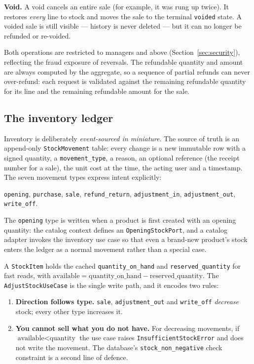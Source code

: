 \documentclass[11pt,a4paper]{article}
\begin{document}
\textbf{Void.} A void cancels an entire sale (for example, it was rung up twice). It restores
\emph{every} line to stock and moves the sale to the terminal \texttt{voided} state. A voided sale is
still visible --- history is never deleted --- but it can no longer be refunded or re-voided.

Both operations are restricted to managers and above (Section~\ref{sec:security}), reflecting the
fraud exposure of reversals. The refundable quantity and amount are always computed by the
aggregate, so a sequence of partial refunds can never over-refund: each request is validated against
the remaining refundable quantity for its line and the remaining refundable amount for the sale.

\subsection{The inventory ledger}
\label{sec:ledger}

Inventory is deliberately \emph{event-sourced in miniature}. The source of truth is an append-only
\texttt{StockMovement} table: every change is a new immutable row with a signed quantity, a
\texttt{movement\_type}, a reason, an optional reference (the receipt number for a sale), the unit
cost at the time, the acting user and a timestamp. The seven movement types express intent
explicitly:

\begin{center}\small
\texttt{opening}, \texttt{purchase}, \texttt{sale}, \texttt{refund\_return},
\texttt{adjustment\_in}, \texttt{adjustment\_out}, \texttt{write\_off}.
\end{center}

The \texttt{opening} type is written when a product is first created with an opening quantity: the
catalog context defines an \texttt{OpeningStockPort}, and a catalog adapter invokes the inventory use
case so that even a brand-new product's stock enters the ledger as a normal movement rather than a
special case.

A \texttt{StockItem} holds the cached \texttt{quantity\_on\_hand} and \texttt{reserved\_quantity}
for fast reads, with $\text{available} = \text{quantity\_on\_hand} - \text{reserved\_quantity}$. The
\texttt{AdjustStockUseCase} is the single write path, and it encodes two rules:

\begin{enumerate}[leftmargin=1.4em]
  \item \textbf{Direction follows type.} \texttt{sale}, \texttt{adjustment\_out} and \texttt{write\_off}
  \emph{decrease} stock; every other type increases it.
  \item \textbf{You cannot sell what you do not have.} For decreasing movements, if
  $\text{available} < \text{quantity}$ the use case raises \texttt{InsufficientStockError} and does
  not write the movement. The database's \texttt{stock\_non\_negative} check constraint is a second
  line of defence.
\end{enumerate}
\end{document}
